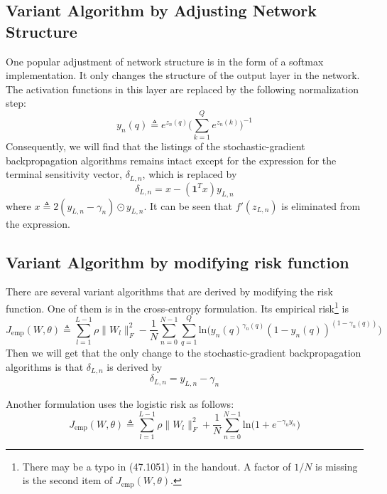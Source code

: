 \documentclass[journal,a4paper,onecolumn,11pt]{IEEEtran}
\begin{document}
\subsection{Variant Algorithm by Adjusting Network Structure}\label{softmax}
One popular adjustment of network structure is in the form of a softmax implementation. It only changes the structure of the output layer in the network. The activation functions in this layer are replaced by the following normalization step:
\begin{equation}
y_n(q) \triangleq e^{z_n(q)} \bigg(\sum_{k=1}^{Q} e^{z_n(k)}\bigg)^{-1}
\end{equation}
Consequently, we will find that the listings of the stochastic-gradient backpropagation algorithms remains intact except for the expression for the terminal sensitivity vector, $\delta_{L,n}$, which is replaced by
\begin{equation}
\delta_{L,n} = x - ({\boldsymbol 1}^T x) y_{L,n}
\end{equation}
where $x \triangleq 2(y_{L,n}-\gamma_n) \odot y_{L,n}$. It can be seen that $f'(z_{L,n})$ is eliminated from the expression.

\subsection{Variant Algorithm by modifying risk function}\label{cross-entropy}
There are several variant algorithms that are derived by modifying the risk function. One of them is in the cross-entropy formulation. Its empirical risk\footnote{There may be a typo in (47.1051) in the handout. A factor of $1/N$ is missing is the second item of $J_{\text{emp}}(W,\theta)$.} is 
\begin{equation}
J_{\text{emp}}(W,\theta) \triangleq \sum_{l=1}^{L-1} \rho \|W_l \|_F^2 - \frac{1}{N} \sum_{n=0}^{N-1} \sum_{q=1}^{Q} \text{ln} \bigg(y_n(q)^{\gamma_n(q)} (1-y_n(q))^{(1-\gamma_n(q))}\bigg)
\end{equation}
Then we will get that the only change to the stochastic-gradient backpropagation algorithms is that $\delta_{L,n}$ is derived by
\begin{equation}
\delta_{L,n} = y_{L,n} - \gamma_n
\end{equation}

Another formulation uses the logistic risk as follows:
\begin{equation}
J_{\text{emp}}(W,\theta) \triangleq \sum_{l=1}^{L-1} \rho \|W_l \|_F^2 + \frac{1}{N} \sum_{n=0}^{N-1} \text{ln} \bigg(1 + e^{-\gamma_n y_n}\bigg)
\end{equation}
\end{document}
